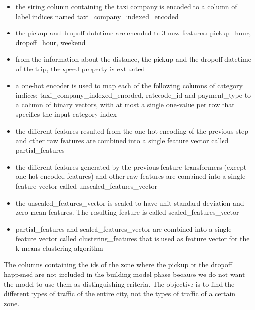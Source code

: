 \documentclass{acm_proc_article-sp-sigmod09}
\begin{document}
\begin{itemize}
	\item the string column containing the taxi company is encoded to a column of label indices named taxi\_company\_indexed\_encoded
	\item the pickup and dropoff datetime are encoded to 3 new features: pickup\_hour, dropoff\_hour, weekend
	\item from the information about the distance, the pickup and the dropoff datetime of the trip, the speed property is extracted
	\item a one-hot encoder is used to map each of the following columns of category indices: taxi\_company\_indexed\_encoded, ratecode\_id and payment\_type to a column of binary vectors, with at most a single one-value per row that specifies the input category index
	\item the different features resulted from the one-hot encoding of the previous step and other raw features are combined into a single feature vector called partial\_features
	\item the different features generated by the previous feature transformers (except one-hot encoded features) and other raw features are combined into a single feature vector called unscaled\_features\_vector
	\item the unscaled\_features\_vector is scaled to have unit standard deviation and zero mean features. The resulting feature is called scaled\_features\_vector
	\item partial\_features and scaled\_features\_vector are combined into a single feature vector called clustering\_features that is used as feature vector for the k-means clustering algorithm
\end{itemize}  

The columns containing the ids of the zone where the pickup or the dropoff happened are not included in the building model phase because we do not want the model to use them as distinguishing criteria. The objective is to find the different types of traffic of the entire city, not the types of traffic of a certain zone.
\end{document}

